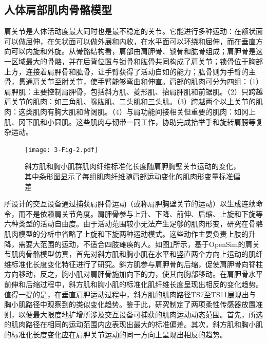 \subsection{人体肩部肌肉骨骼模型}
肩关节是人体活动度最大同时也是最不稳定的关节。它能进行多种运动：在额状面可以做屈伸，在矢状面可以做外展和内收，在水平面可以环绕和屈伸，而在垂直方向可以内旋和外旋。从骨骼结构看，肩部由肩胛骨、锁骨和肱骨组成；肩胛骨是这一区域最大的骨骼，并在后背位置与锁骨和肱骨共同构成了肩关节；锁骨位于胸部上方，连接着肩胛骨和肱骨，让手臂获得了活动自如的能力；肱骨则为手臂的主骨，贯通肩关节至肘关节，使手臂能够弯曲和伸直。肩部的肌肉可分为四组：（1）肩胛肌：主要控制肩胛骨，包括斜方肌、菱形肌、抬肩胛肌和前锯肌。（2）只跨越肩关节的肌肉：如三角肌、喙肱肌、二头肌和三头肌。（3）跨越两个以上关节的肌肉：这类肌肉有胸大肌和背阔肌。（4）与肩功能间接相关但重要的肌肉：如冈上肌、冈下肌和小圆肌。这些肌肉与韧带一同工作，协助完成抬举手和旋转肩膀等复杂运动\cite{terryFunctionalAnatomyShoulder2000}。

\begin{figure}[htb]
    \centering
    \texttt{[image: 3-Fig-2.pdf]}
    \caption{斜方肌和胸小肌群肌肉纤维标准化长度随肩胛胸壁关节运动的变化，其中条形图显示了每组肌肉纤维随肩部运动变化的肌肉形变量标准偏差}
    \label{fig:3-2}
\end{figure}

所设计的交互设备通过捕获肩胛骨运动（或称肩胛胸壁关节的运动）以生成连续命令，而不是依赖肩关节角度。肩胛骨参与上升、下降、前伸、后缩、上旋和下旋等六种类型的活动自由度。由于活动范围较小无法产生足够的肌肉形变，研究在骨骼肌肉模型的分析中省略了上旋和下旋两种运动模式。这些动作主要负责上肢的升降，需要大范围的运动，不适合四肢瘫痪的人。如图\ref*{fig:3-2}所示，基于OpenSim\cite{chadwickRealTimeSimulationThreeDimensional2014}的肩关节肌肉骨骼模型仿真，首先对斜方肌和胸小肌在水平和竖直两个方向上运动的肌纤维标准化长度变化特征进行了研究。斜方肌参与肩胛骨的后缩，促使肩胛骨向脊柱方向移动，反之，胸小肌对肩胛骨施加向下的力，使其向胸部移动。在肩胛骨水平前伸和后缩过程中，斜方肌和胸小肌的标准化肌纤维长度呈现出相反的变化趋势。值得一提的是，在垂直肩胛运动过程中，斜方肌的肌肉路径TS7至TS11展现出与胸小肌路径中观察到的类似变化趋势。鉴于此，研究制定了两项柔性传感器放置准则，以便最大限度地扩增所涉及交互设备可捕获的肌肉运动动态范围。首先，所选的肌肉路径在相同的运动范围内应表现出最大的标准偏差。其次，斜方肌和胸小肌的标准化长度变化应在肩胛关节运动的同一方向上呈现出相反的趋势。

